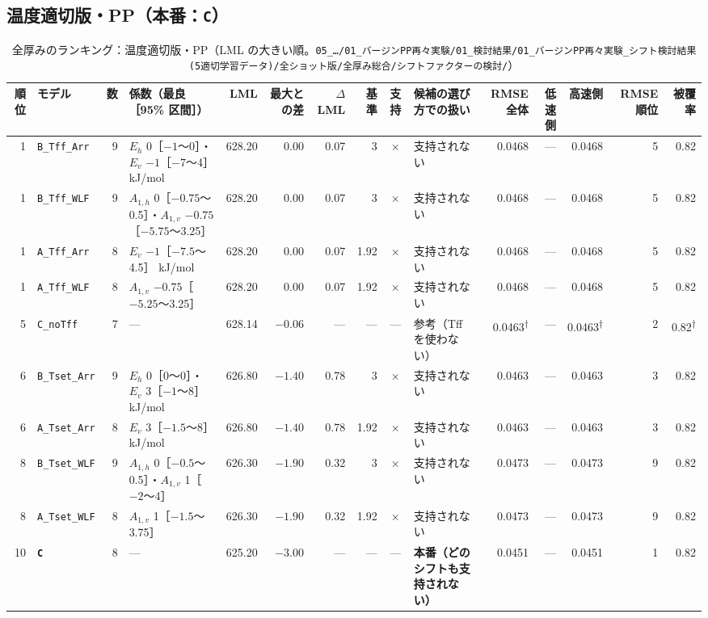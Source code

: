 \documentclass[paper=a4paper,landscape,fontsize=10pt,line_length=62zw,number_of_lines=34]{jlreq}
\let\origtextbf\textbf
\renewcommand{\textbf}[1]{\origtextbf{\gtfamily #1}}   %
\begin{document}
\subsection{温度適切版・PP（本番：\texttt{C}）}
\begin{table}[H]\centering\footnotesize
\caption{全厚みのランキング：温度適切版・PP（LML の大きい順。\texttt{05\_\allowbreak{}…/\allowbreak{}01\_\allowbreak{}バージンPP再々実験/\allowbreak{}01\_\allowbreak{}検討結果/\allowbreak{}01\_\allowbreak{}バージンPP再々実験\_\allowbreak{}シフト検討結果(5適切学習データ)/\allowbreak{}全ショット版/\allowbreak{}全厚み総合/\allowbreak{}シフトファクターの検討/\allowbreak{}}）}
\begin{tabular}{rlrp{12\zw}rrrrcp{8.5\zw}rrrrr}
\toprule
順位 & モデル & 数 & 係数（最良［95\% 区間］） & LML & 最大との差 & $\Delta$LML & 基準 & 支持 & 候補の選び方での扱い & RMSE 全体 & 低速側 & 高速側 & RMSE 順位 & 被覆率 \\
\midrule
1 & \texttt{B\_\allowbreak{}Tff\_\allowbreak{}Arr} & 9 & $E_h$ 0［$-1$〜0］・$E_v$ $-1$［$-7$〜4］ kJ/mol & 628.20 & 0.00 & 0.07 & 3 & × & 支持されない & 0.0468 & --- & 0.0468 & 5 & 0.82 \\
1 & \texttt{B\_\allowbreak{}Tff\_\allowbreak{}WLF} & 9 & $A_{1,h}$ 0［$-0.75$〜0.5］・$A_{1,v}$ $-0.75$［$-5.75$〜3.25］ & 628.20 & 0.00 & 0.07 & 3 & × & 支持されない & 0.0468 & --- & 0.0468 & 5 & 0.82 \\
1 & \texttt{A\_\allowbreak{}Tff\_\allowbreak{}Arr} & 8 & $E_v$ $-1$［$-7.5$〜4.5］ kJ/mol & 628.20 & 0.00 & 0.07 & 1.92 & × & 支持されない & 0.0468 & --- & 0.0468 & 5 & 0.82 \\
1 & \texttt{A\_\allowbreak{}Tff\_\allowbreak{}WLF} & 8 & $A_{1,v}$ $-0.75$［$-5.25$〜3.25］ & 628.20 & 0.00 & 0.07 & 1.92 & × & 支持されない & 0.0468 & --- & 0.0468 & 5 & 0.82 \\
5 & \texttt{C\_\allowbreak{}noTff} & 7 & --- & 628.14 & $-0.06$ & --- & --- & --- & 参考（Tff を使わない） & 0.0463\textsuperscript{†} & --- & 0.0463\textsuperscript{†} & 2 & 0.82\textsuperscript{†} \\
6 & \texttt{B\_\allowbreak{}Tset\_\allowbreak{}Arr} & 9 & $E_h$ 0［0〜0］・$E_v$ 3［$-1$〜8］ kJ/mol & 626.80 & $-1.40$ & 0.78 & 3 & × & 支持されない & 0.0463 & --- & 0.0463 & 3 & 0.82 \\
6 & \texttt{A\_\allowbreak{}Tset\_\allowbreak{}Arr} & 8 & $E_v$ 3［$-1.5$〜8］ kJ/mol & 626.80 & $-1.40$ & 0.78 & 1.92 & × & 支持されない & 0.0463 & --- & 0.0463 & 3 & 0.82 \\
8 & \texttt{B\_\allowbreak{}Tset\_\allowbreak{}WLF} & 9 & $A_{1,h}$ 0［$-0.5$〜0.5］・$A_{1,v}$ 1［$-2$〜4］ & 626.30 & $-1.90$ & 0.32 & 3 & × & 支持されない & 0.0473 & --- & 0.0473 & 9 & 0.82 \\
8 & \texttt{A\_\allowbreak{}Tset\_\allowbreak{}WLF} & 8 & $A_{1,v}$ 1［$-1.5$〜3.75］ & 626.30 & $-1.90$ & 0.32 & 1.92 & × & 支持されない & 0.0473 & --- & 0.0473 & 9 & 0.82 \\
10 & \textbf{\texttt{C}} & 8 & --- & 625.20 & $-3.00$ & --- & --- & --- & \textbf{本番（どのシフトも支持されない）} & 0.0451 & --- & 0.0451 & 1 & 0.82 \\
\bottomrule
\end{tabular}
\end{table}
\end{document}
